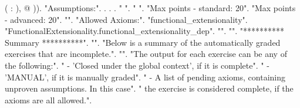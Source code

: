 \documentclass[12pt]{report}
\begin{document}
\begin{coqdoccode}
\coqdocindent{1.50em}
(\coqdocvar{\_} :       ),\coqdoceol
\coqdocindent{0.50em}
@   )).\coqdoceol
\coqdocnoindent
{} "Assumptions:".\coqdoceol
\coqdocnoindent
{}.\coqdoceol
\coqdocnoindent
{}  .\coqdoceol
\coqdocnoindent
{} .\coqdoceol
\coqdocnoindent
{} " ".\coqdoceol
\coqdocemptyline
\coqdocnoindent
{} " ".\coqdoceol
\coqdocemptyline
\coqdocnoindent
{} "Max points - standard: 20".\coqdoceol
\coqdocnoindent
{} "Max points - advanced: 20".\coqdoceol
\coqdocnoindent
{} "".\coqdoceol
\coqdocnoindent
{} "Allowed Axioms:".\coqdoceol
\coqdocnoindent
{} "functional\_extensionality".\coqdoceol
\coqdocnoindent
{} "FunctionalExtensionality.functional\_extensionality\_dep".\coqdoceol
\coqdocnoindent
{} "".\coqdoceol
\coqdocnoindent
{} "".\coqdoceol
\coqdocnoindent
{} "********** Summary **********".\coqdoceol
\coqdocnoindent
{} "".\coqdoceol
\coqdocnoindent
{} "Below is a summary of the automatically graded exercises that are incomplete.".\coqdoceol
\coqdocnoindent
{} "".\coqdoceol
\coqdocnoindent
{} "The output for each exercise can be any of the following:".\coqdoceol
\coqdocnoindent
{} "  - 'Closed under the global context', if it is complete".\coqdoceol
\coqdocnoindent
{} "  - 'MANUAL', if it is manually graded".\coqdoceol
\coqdocnoindent
{} "  - A list of pending axioms, containing unproven assumptions. In this case".\coqdoceol
\coqdocnoindent
{} "    the exercise is considered complete, if the axioms are all allowed.".\coqdoceol

\end{coqdoccode}
\end{document}
